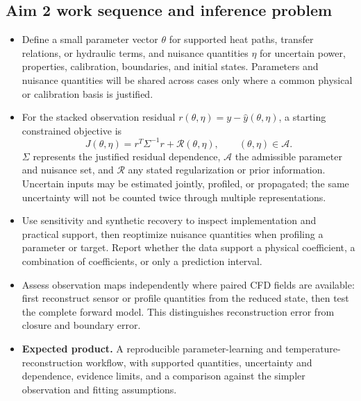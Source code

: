 \subsection{Aim 2 work sequence and inference problem}\label{subsec:aim-two-work-sequence}
\begin{itemize}[leftmargin=*]
\item Define a small parameter vector $\theta$ for supported heat paths, transfer relations, or hydraulic terms, and nuisance quantities $\eta$ for uncertain power, properties, calibration, boundaries, and initial states. Parameters and nuisance quantities will be shared across cases only where a common physical or calibration basis is justified.
\item For the stacked observation residual $r(\theta,\eta)=y-\widehat y(\theta,\eta)$, a starting constrained objective is
\begin{equation}
J(\theta,\eta)=r^T\Sigma^{-1}r+\mathcal R(\theta,\eta),
\qquad (\theta,\eta)\in\mathcal A.
\label{eq:learning-objective}
\end{equation}
$\Sigma$ represents the justified residual dependence, $\mathcal A$ the admissible parameter and nuisance set, and $\mathcal R$ any stated regularization or prior information. Uncertain inputs may be estimated jointly, profiled, or propagated; the same uncertainty will not be counted twice through multiple representations.\cite{raue2009identifiability,kristensen2004greybox}
\item Use sensitivity and synthetic recovery to inspect implementation and practical support, then reoptimize nuisance quantities when profiling a parameter or target. Report whether the data support a physical coefficient, a combination of coefficients, or only a prediction interval.
\item Assess observation maps independently where paired CFD fields are available: first reconstruct sensor or profile quantities from the reduced state, then test the complete forward model. This distinguishes reconstruction error from closure and boundary error.
\item \textbf{Expected product.} A reproducible parameter-learning and temperature-reconstruction workflow, with supported quantities, uncertainty and dependence, evidence limits, and a comparison against the simpler observation and fitting assumptions.
\end{itemize}

